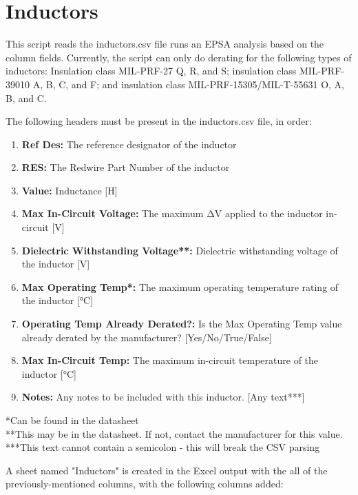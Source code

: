\documentclass[12pt]{article}
\begin{document}
\section{Inductors}
This script reads the inductors.csv file runs an EPSA analysis based on the column fields. Currently, the script can only do derating for the following types of inductors: Insulation class MIL-PRF-27 Q, R, and S; insulation class MIL-PRF-39010 A, B, C, and F; and insulation class MIL-PRF-15305/MIL-T-55631 O, A, B, and C.

The following headers must be present in the inductors.csv file, in order:

\begin{enumerate}
    \item \textbf{Ref Des:} The reference designator of the inductor
    \item \textbf{RES:} The Redwire Part Number of the inductor
    \item \textbf{Value:} Inductance [H]
    \item \textbf{Max In-Circuit Voltage:} The maximum ΔV applied to the inductor in-circuit [V]
    \item \textbf{Dielectric Withstanding Voltage**:} Dielectric withstanding voltage of the inductor [V]
    \item \textbf{Max Operating Temp*:} The maximum operating temperature rating of the inductor [°C] 
    \item \textbf{Operating Temp Already Derated?:} Is the Max Operating Temp value already derated by the manufacturer? [Yes/No/True/False]
    \item \textbf{Max In-Circuit Temp:} The maximum in-circuit temperature of the inductor [°C] 
    \item \textbf{Notes:} Any notes to be included with this inductor. [Any text***]
\end{enumerate}

{\footnotesize
*Can be found in the datasheet\\
**This may be in the datasheet. If not, contact the manufacturer for this value.\\
***This text cannot contain a semicolon - this will break the CSV parsing
}

A sheet named "Inductors" is created in the Excel output with the all of the previously-mentioned columns, with the following columns added:
\end{document}
